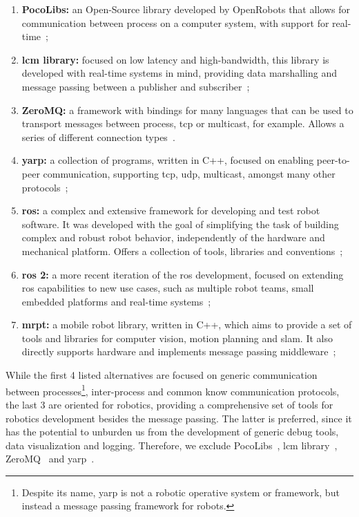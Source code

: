 \begin{enumerate}
	\item \textbf{PocoLibs:} an Open-Source library developed by OpenRobots that allows for communication between process on a computer system, with support for real-time~\cite{Pocolibs};
	\item \textbf{\ac{lcm} library:} focused on low latency and high-bandwidth, this library is developed with real-time systems in mind, providing data marshalling and message passing between a publisher and subscriber~\cite{Huang2010b};
	\item \textbf{ZeroMQ:} a framework with bindings for many languages that can be used to transport messages between process, \ac{tcp} or multicast, for example. Allows a series of different connection types~\cite{ZeroMQ}.
	\item \textbf{\ac{yarp}:} a collection of programs, written in C++, focused on enabling peer-to-peer communication, supporting \ac{tcp}, \ac{udp}, multicast, amongst many other protocols~\cite{Metta2006};
	\item \textbf{\ac{ros}:} a complex and extensive framework for developing and test robot software. It was developed with the goal of simplifying the task of building complex and robust robot behavior, independently of the hardware and mechanical platform. Offers a collection of tools, libraries and conventions~\cite{ROS};
	\item \textbf{\ac{ros} 2:} a more recent iteration of the \ac{ros} development, focused on extending \ac{ros} capabilities to new use cases, such as multiple robot teams, small embedded platforms and real-time systems~\cite{ROS2};
	\item \textbf{\ac{mrpt}:} a mobile robot library, written in C++, which aims to provide a set of tools and libraries for computer vision, motion planning and \ac{slam}. It also directly supports hardware and implements message passing middleware~\cite{MRPT};
\end{enumerate}

While the first 4 listed alternatives are focused on generic communication between processes\footnote{Despite its name, \acf{yarp} is not a robotic operative system or framework, but instead a message passing framework for robots.}, inter-process and common know communication protocols, the last 3 are oriented for robotics, providing a comprehensive set of tools for robotics development besides the message passing. The latter is preferred, since it has the potential to unburden us from the development of generic debug tools, data visualization and logging. Therefore, we exclude PocoLibs~\cite{Pocolibs}, \ac{lcm} library~\cite{Huang2010b}, ZeroMQ~\cite{ZeroMQ} and \ac{yarp}~\cite{Metta2006}.

